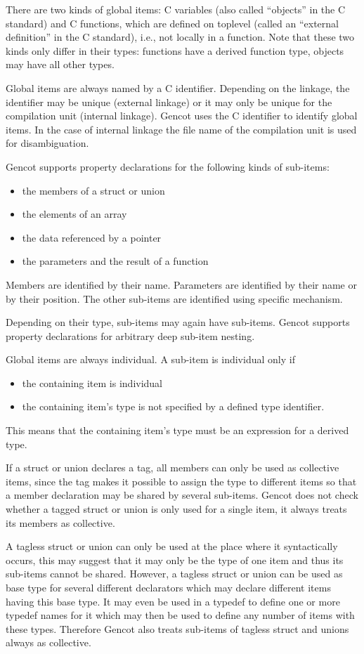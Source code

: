 There are two kinds of global items: C variables (also called ``objects'' in the C standard) and C functions, which
are defined on toplevel (called an ``external definition'' in the C standard), i.e., not locally in a function. Note that
these two kinds only differ in their types: functions have a derived function type, objects may have all other types.

Global items are always named by a C identifier. Depending on the linkage, the identifier may be unique (external linkage)
or it may only be unique for the compilation unit (internal linkage). Gencot uses the C identifier to identify global 
items. In the case of internal linkage the file name of the compilation unit is used for disambiguation.

Gencot supports property declarations for the following kinds of sub-items:
\begin{itemize}
\item the members of a struct or union
\item the elements of an array
\item the data referenced by a pointer
\item the parameters and the result of a function
\end{itemize}
Members are identified by their name. Parameters are identified by their name or by their position. The other
sub-items are identified using specific mechanism.

Depending on their type, sub-items may again have sub-items. Gencot supports property declarations for arbitrary
deep sub-item nesting.

Global items are always individual. A sub-item is individual only if
\begin{itemize}
\item the containing item is individual
\item the containing item's type is not specified by a defined type identifier.
\end{itemize}
This means that the containing item's type must be an expression for a derived type.

If a struct or union declares a tag, all members can only be used as collective items, since the tag makes it possible
to assign the type to different items so that a member declaration may be shared by several sub-items. Gencot does
not check whether a tagged struct or union is only used for a single item, it always treats its members as collective.

A tagless struct or union can only be used at the place where it syntactically occurs, this may suggest that it may 
only be the type of one item and thus its sub-items cannot be shared. However, a tagless struct or union can be used as 
base type for several different declarators which may declare different items having this base type. It may even be
used in a typedef to define one or more typedef names for it which may then be used to define any number of items
with these types. Therefore Gencot also treats sub-items of tagless struct and unions always as collective.

